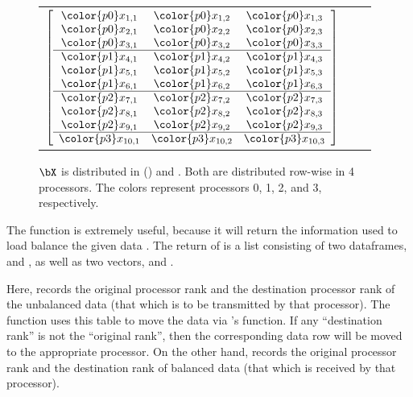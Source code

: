 \begin{figure}[h]
\begin{center}
\begin{tabular}{ccc}
$
\left[
\begin{array}{ccc}
\color{p0}x_{1,1} & \color{p0}x_{1,2} & \color{p0}x_{1,3} \\
\color{p0}x_{2,1} & \color{p0}x_{2,2} & \color{p0}x_{2,3} \\
\color{p0}x_{3,1} & \color{p0}x_{3,2} & \color{p0}x_{3,3} \\ \hline
\color{p1}x_{4,1} & \color{p1}x_{4,2} & \color{p1}x_{4,3} \\
\color{p1}x_{5,1} & \color{p1}x_{5,2} & \color{p1}x_{5,3} \\
\color{p1}x_{6,1} & \color{p1}x_{6,2} & \color{p1}x_{6,3} \\ \hline
\color{p2}x_{7,1} & \color{p2}x_{7,2} & \color{p2}x_{7,3} \\
\color{p2}x_{8,1} & \color{p2}x_{8,2} & \color{p2}x_{8,3} \\
\color{p2}x_{9,1} & \color{p2}x_{9,2} & \color{p2}x_{9,3} \\ \hline
\color{p3}x_{10,1} & \color{p3}x_{10,2} & \color{p3}x_{10,3} \\
\end{array}
\right]
$
\end{tabular}
\end{center}
\caption{
$\bX$ is distributed in
() and .
Both are distributed row-wise in 4 processors.  The colors represent processors {\color{p0}0},
{\color{p1}1}, {\color{p2}2}, and {\color{p3}3}, respectively.
}
\label{fig:load_balance}
\end{figure}
 

The function  is extremely useful, because it will return the information used to load balance the given data .  The return of  is a list consisting of two dataframes,  and , as well as two vectors,  and .  

Here,  records the original processor rank and the destination processor rank of the unbalanced data (that which is to be transmitted by that processor).
The  function uses this table to move the data via 's  function.
If any ``destination rank'' is not the ``original rank'', then the corresponding data row will be moved to the appropriate processor.  On the other hand,  records the original processor rank and the destination rank of balanced data (that which is received by that processor).

